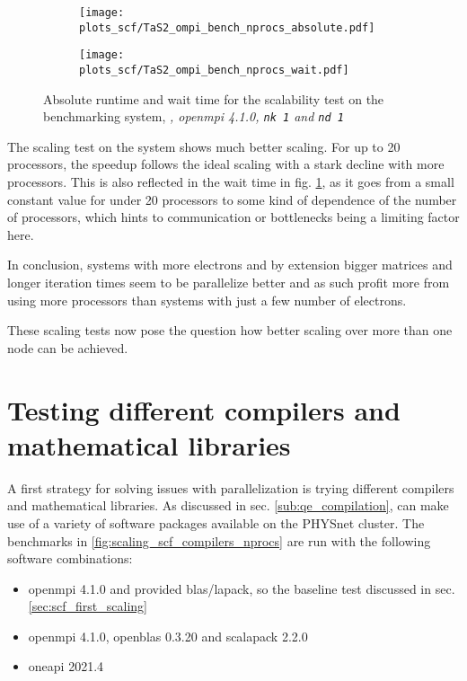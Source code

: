 \documentclass[main.tex]{subfiles}
\begin{document}
\begin{figure}[ht!]
\begin{subfigure}[b]{0.49\textwidth}
    \centering
    \texttt{[image: plots\_scf/TaS2\_ompi\_bench\_nprocs\_absolute.pdf]}
\end{subfigure}
\begin{subfigure}[b]{0.49\textwidth}
    \centering
    \texttt{[image: plots\_scf/TaS2\_ompi\_bench\_nprocs\_wait.pdf]}
\end{subfigure}
\caption{Absolute runtime and wait time for the scalability test on the \TaS benchmarking system, \emph{, \gls{openmpi} 4.1.0, \texttt{nk 1} and \texttt{nd 1}}}
\label{fig:scaling_scf_ompi_nprocs_tas2_absolute_wait}
\end{figure}
The scaling test on the \TaS system shows much better scaling.
For up to 20 processors, the speedup follows the ideal scaling with a stark decline with more processors.
This is also reflected in the wait time in fig. \ref{fig:scaling_scf_ompi_nprocs_tas2_absolute_wait}, as it goes from a small constant value for under 20 processors to some kind of dependence of the number of processors, which hints to communication or bottlenecks being a limiting factor here.

In conclusion, systems with more electrons and by extension bigger matrices and longer iteration times seem to be parallelize better and as such profit more from using more processors than systems with just a few number of electrons.

These scaling tests now pose the question how better scaling over more than one node can be achieved.

\section{Testing different compilers and mathematical libraries}\label{sec:scf_scaling_compilers}

A first strategy for solving issues with parallelization is trying different compilers and mathematical libraries.
As discussed in sec. \ref{sub:qe_compilation}, \QE can make use of a variety of software packages available on the PHYSnet cluster.
The benchmarks in \ref{fig:scaling_scf_compilers_nprocs} are run with the following software combinations:
\begin{itemize}
    \item \gls{openmpi} 4.1.0 and \QE provided \gls{blas}/\gls{lapack}, so the baseline test discussed in sec. \ref{sec:scf_first_scaling}
    \item \gls{openmpi} 4.1.0, \gls{openblas} 0.3.20 and \gls{scalapack} 2.2.0
    \item \gls{oneapi} 2021.4
\end{itemize}
\end{document}
